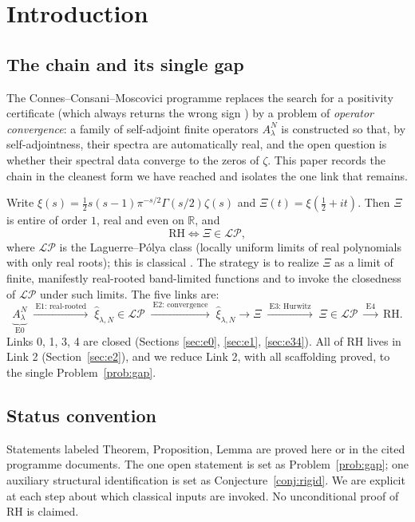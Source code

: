 \documentclass[11pt]{amsart}
\theoremstyle{definition}
\theoremstyle{remark}
\newcommand{\RH}{\mathrm{RH}}
\newcommand{\bbR}{\mathbb{R}}
\newcommand{\xih}{\widehat{\xi}}
\newcommand{\LP}{\mathcal{LP}}
\begin{document}
\section{Introduction}

\subsection{The chain and its single gap}
The Connes--Consani--Moscovici programme \cite{CCM} replaces the search for a
positivity certificate (which always returns the wrong sign \cite{P13}) by a
problem of \emph{operator convergence}: a family of self-adjoint finite
operators $A_\lambda^N$ is constructed so that, by self-adjointness, their
spectra are automatically real, and the open question is whether their
spectral data converge to the zeros of $\zeta$. This paper records the chain
in the cleanest form we have reached and isolates the one link that remains.

Write $\xi(s)=\tfrac12 s(s-1)\pi^{-s/2}\Gamma(s/2)\zeta(s)$ and
$\Xi(t)=\xi(\tfrac12+it)$. Then $\Xi$ is entire of order $1$, real and even on
$\bbR$, and
\begin{equation}\label{eq:rh-lp}
\RH\iff \Xi\in\LP,
\end{equation}
where $\LP$ is the Laguerre--P\'olya class (locally uniform limits of real
polynomials with only real roots); this is classical \cite{deBranges}. The
strategy is to realize $\Xi$ as a limit of finite, manifestly real-rooted
band-limited functions and to invoke the closedness of $\LP$ under such
limits. The five links are:
\[
\underbrace{A_\lambda^N}_{\text{E0}}
\;\xrightarrow{\ \text{E1: real-rooted}\ }\;
\xih_{\lambda,N}\in\LP
\;\xrightarrow{\ \text{E2: convergence}\ }\;
\xih_{\lambda,N}\to\Xi
\;\xrightarrow{\ \text{E3: Hurwitz}\ }\;
\Xi\in\LP
\;\xrightarrow{\ \text{E4}\ }\;
\RH .
\]
Links 0, 1, 3, 4 are closed (Sections \ref{sec:e0}, \ref{sec:e1},
\ref{sec:e34}). All of $\RH$ lives in Link 2 (Section~\ref{sec:e2}), and we
reduce Link 2, with all scaffolding proved, to the single
Problem~\ref{prob:gap}.

\subsection{Status convention}
Statements labeled Theorem, Proposition, Lemma are proved here or in the cited
programme documents. The one open statement is set as
Problem~\ref{prob:gap}; one auxiliary structural identification is set as
Conjecture~\ref{conj:rigid}. We are explicit at each step about which
classical inputs are invoked. No unconditional proof of $\RH$ is claimed.
\end{document}
